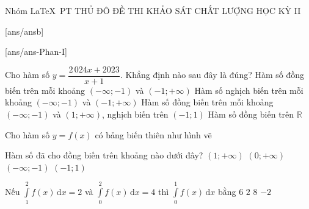 \begin{name}
	{Nhóm \LaTeX\ PT THỦ ĐÔ}
	{ĐỀ THI KHẢO SÁT CHẤT LƯỢNG HỌC KỲ II}
\end{name}

[ans/ansb\currfilebase]


\caulc
{}[ans/ans\currfilebase-Phan-I]

\begin{ex}%
	Cho hàm số $y=\dfrac{2\,024x+2023}{x+1}$. Khẳng định nào sau đây là đúng?
	\choice
	{\True Hàm số đồng biến trên mỗi khoảng $(-\infty;-1)$ và $(-1;+\infty)$}
	{Hàm số nghịch biến trên mỗi khoảng $(-\infty;-1)$ và $(-1;+\infty)$}
	{Hàm số đồng biến trên mỗi khoảng $(-\infty;-1)$ và $(1;+\infty)$, nghịch biến trên $(-1 ; 1)$}
	{Hàm số đồng biến trên $\mathbb{R}$}
\end{ex}

\begin{ex}%
	Cho hàm số $y=f(x)$ có bảng biến thiên như hình vẽ
	\begin{center}
	\end{center}
	Hàm số đã cho đồng biến trên khoảng nào dưới đây?
	\choice
	{\True $(1;+\infty)$}
	{$(0;+\infty)$}
	{$(-\infty;-1)$}
	{$(-1;1)$}
\end{ex}

\begin{ex}%
	Nếu $\displaystyle\int\limits_1^2 f(x)\mathrm{\,d}x=2$ và $\displaystyle\int\limits_0^2  f(x)\mathrm{\,d}x=4$ thì $\displaystyle\int\limits_0^1 f(x)\mathrm{\,d}x$ bằng
	\choice
	{$6$}
	{\True $2$}
	{$8$}
	{$-2$}
\end{ex}

